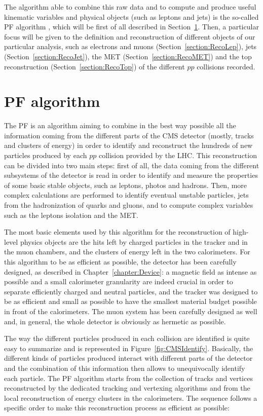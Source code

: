 \documentclass[a4paper, 10pt, openright]{report}
\begin{document}
The algorithm able to combine this raw data and to compute and produce useful kinematic variables and physical objects (such as leptons and jets) is the so-called \acf{PF} algorithm \cite{PF}, which will be first of all described in Section~\ref{section:PF}. Then, a particular focus will be given to the definition and reconstruction of different objects of our particular analysis, such as electrons and muons (Section~\ref{section:RecoLep}), jets (Section~\ref{section:RecoJet}), the \ac{MET} (Section~\ref{section:RecoMET}) and the top reconstruction (Section~\ref{section:RecoTop}) of the different $pp$ collisions recorded.

\section{\acf{PF} algorithm} \label{section:PF}

The \ac{PF} is an algorithm aiming to combine in the best way possible all the information coming from the different parts of the \ac{CMS} detector (mostly, tracks and clusters of energy) in order to identify and reconstruct the hundreds of new particles produced by each $pp$ collision provided by the \ac{LHC}. This reconstruction can be divided into two main steps: first of all, the data coming from the different subsystems of the detector is read in order to identify and measure the properties of some basic stable objects, such as leptons, photos and hadrons. Then, more complex calculations are performed to identify eventual unstable particles, jets from the hadronization of quarks and gluons, and to compute complex variables such as the leptons isolation and the \ac{MET}.

The most basic elements used by this algorithm for the reconstruction of high-level physics objects are the hits left by charged particles in the tracker and in the muon chambers, and the clusters of energy left in the two calorimeters. For this algorithm to be as efficient as possible, the detector has been carefully designed, as described in Chapter~\ref{chapter:Device}: a magnetic field as intense as possible and a small calorimeter granularity are indeed crucial in order to separate efficiently charged and neutral particles, and the tracker was designed to be as efficient and small as possible to have the smallest material budget possible in front of the calorimeters. The muon system has been carefully designed as well and, in general, the whole detector is obviously as hermetic as possible.

The way the different particles produced in each collision are identified is quite easy to summarize and is represented in Figure~\ref{fig:CMSIdentify}. Basically, the different kinds of particles produced interact with different parts of the detector and the combination of this information then allows to unequivocally identify each particle. The \ac{PF} algorithm starts from the collection of tracks and vertices reconstructed by the dedicated tracking and vertexing algorithms and from the local reconstruction of energy clusters in the calorimeters. The sequence follows a specific order to make this reconstruction process as efficient as possible:
\end{document}

